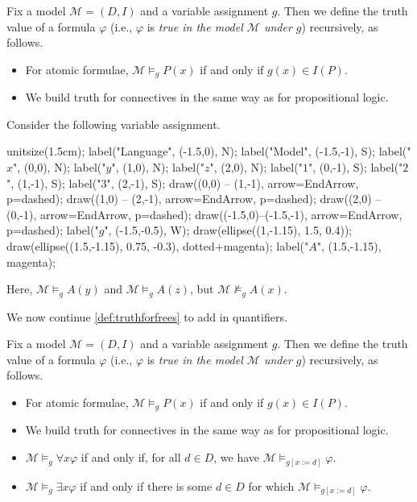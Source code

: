 \begin{definition}[Truth] \label{def:truthforfrees}
	Fix a model $\mathcal M=(D,I)$ and a variable assignment $g$. Then we define the truth value of a formula $\varphi$ (i.e., $\varphi$ is \textit{true in the model $\mathcal M$ under $g$}) recursively, as follows.
	\begin{itemize}
		\item For atomic formulae, $\mathcal M\models_gP(x)$ if and only if $g(x)\in I(P)$.
		\item We build truth for connectives in the same way as for propositional logic.
	\end{itemize}
\end{definition}
\begin{example}
	Consider the following variable assignment.
	\begin{center}
		\begin{asy}
			unitsize(1.5cm);
			label("Language", (-1.5,0), N);
			label("Model", (-1.5,-1), S);
			label("$x$", (0,0), N);
			label("$y$", (1,0), N);
			label("$z$", (2,0), N);
			label("$1$", (0,-1), S);
			label("$2$", (1,-1), S);
			label("$3$", (2,-1), S);
			draw((0,0) -- (1,-1), arrow=EndArrow, p=dashed);
			draw((1,0) -- (2,-1), arrow=EndArrow, p=dashed);
			draw((2,0) -- (0,-1), arrow=EndArrow, p=dashed);
			draw((-1.5,0)--(-1.5,-1), arrow=EndArrow, p=dashed);
			label("$g$", (-1.5,-0.5), W);
			draw(ellipse((1,-1.15), 1.5, 0.4));
			draw(ellipse((1.5,-1.15), 0.75, -0.3), dotted+magenta);
			label("$A$", (1.5,-1.15), magenta);
		\end{asy}
	\end{center}
	Here, $\mathcal M\models_gA(y)$ and $\mathcal M\models_gA(z)$, but $\mathcal M\not\models_gA(x)$.
\end{example}
We now continue \autoref{def:truthforfrees} to add in quantifiers.
\begin{defihelper}[Truth]
	Fix a model $\mathcal M=(D,I)$ and a variable assignment $g$. Then we define the truth value of a formula $\varphi$ (i.e., $\varphi$ is \textit{true in the model $\mathcal M$ under $g$}) recursively, as follows.
	\begin{itemize}
		\item For atomic formulae, $\mathcal M\models_gP(x)$ if and only if $g(x)\in I(P)$.
		\item We build truth for connectives in the same way as for propositional logic.
		\item $\mathcal M\models_g\forall x\varphi$ if and only if, for all $d\in D$, we have $\mathcal M\models_{g[x:=d]}\varphi$.
		\item $\mathcal M\models_g\exists x\varphi$ if and only if there is some $d\in D$ for which $\mathcal M\models_{g[x:=d]}\varphi$.
	\end{itemize}
\end{defihelper}
